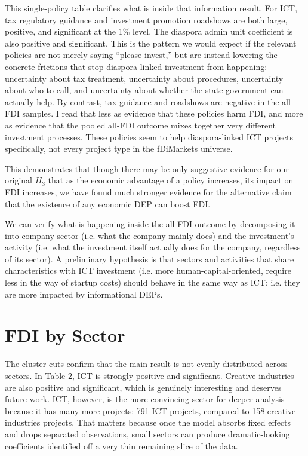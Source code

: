 \documentclass[doublespace,nopageskip]{UVAthesis}
\begin{document}
This single-policy table clarifies what is inside that information result. For ICT, tax regulatory guidance and investment promotion roadshows are both large, positive, and significant at the 1\% level. The diaspora admin unit coefficient is also positive and significant. This is the pattern we would expect if the relevant policies are not merely saying ``please invest,'' but are instead lowering the concrete frictions that stop diaspora-linked investment from happening: uncertainty about tax treatment, uncertainty about procedures, uncertainty about who to call, and uncertainty about whether the state government can actually help. By contrast, tax guidance and roadshows are negative in the all-FDI samples. I read that less as evidence that these policies harm FDI, and more as evidence that the pooled all-FDI outcome mixes together very different investment processes. These policies seem to help diaspora-linked ICT projects specifically, not every project type in the fDiMarkets universe.

This demonstrates that though there may be only suggestive evidence for our original $H_3$ that as the economic advantage of a policy increases, its impact on FDI increases, we have found much stronger evidence for the alternative claim that the existence of any economic DEP can boost FDI.

We can verify what is happening inside the all-FDI outcome by decomposing it into company sector (i.e. what the company mainly does) and the investment's activity (i.e. what the investment itself actually does for the company, regardless of its sector). A preliminary hypothesis is that sectors and activities that share characteristics with ICT investment (i.e. more human-capital-oriented, require less in the way of startup costs) should behave in the same way as ICT: i.e. they are more impacted by informational DEPs.

\section{FDI by Sector} \label{ss: sector}





The cluster cuts confirm that the main result is not evenly distributed across sectors. In Table 2, ICT is strongly positive and significant. Creative industries are also positive and significant, which is genuinely interesting and deserves future work. ICT, however, is the more convincing sector for deeper analysis because it has many more projects: 791 ICT projects, compared to 158 creative industries projects. That matters because once the model absorbs fixed effects and drops separated observations, small sectors can produce dramatic-looking coefficients identified off a very thin remaining slice of the data.
\end{document}
